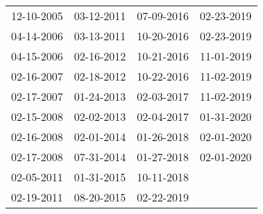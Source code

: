 \begin{supertabular}{llll}
 12-10-2005 &  03-12-2011 &  07-09-2016 &  02-23-2019 \\
 04-14-2006 &  03-13-2011 &  10-20-2016 &  02-23-2019 \\
 04-15-2006 &  02-16-2012 &  10-21-2016 &  11-01-2019 \\
 02-16-2007 &  02-18-2012 &  10-22-2016 &  11-02-2019 \\
 02-17-2007 &  01-24-2013 &  02-03-2017 &  11-02-2019 \\
 02-15-2008 &  02-02-2013 &  02-04-2017 &  01-31-2020 \\
 02-16-2008 &  02-01-2014 &  01-26-2018 &  02-01-2020 \\
 02-17-2008 &  07-31-2014 &  01-27-2018 &  02-01-2020 \\
 02-05-2011 &  01-31-2015 &  10-11-2018 &             \\
 02-19-2011 &  08-20-2015 &  02-22-2019 &             \\
\end{supertabular}

